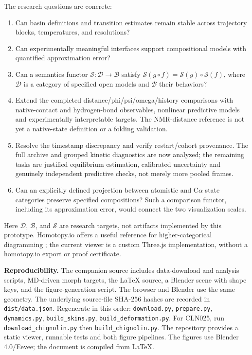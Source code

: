 \documentclass[11pt]{article}
\begin{document}
The research questions are concrete:
\begin{enumerate}
\item Can basin definitions and transition estimates remain stable across
trajectory blocks, temperatures, and resolutions?
\item Can experimentally meaningful interfaces support compositional
models with quantified approximation error?
\item Can a semantics functor $\mathcal S:\mathcal D\to\mathcal B$ satisfy
$\mathcal S(g\circ f)=\mathcal S(g)\circ\mathcal S(f)$, where $\mathcal D$
is a category of specified open models and $\mathcal B$ their behaviors?
\item Extend the completed distance/phi/psi/omega/history comparisons with
native-contact and hydrogen-bond observables, nonlinear predictive models
and experimentally interpretable targets. The NMR-distance reference is
not yet a native-state definition or a folding validation.
\item Resolve the timestamp discrepancy and verify restart/cohort provenance.
The full archive and grouped kinetic diagnostics are now analyzed; the
remaining tasks are justified equilibrium estimation, calibrated uncertainty
and genuinely independent predictive checks, not merely more pooled frames.
\item Can an explicitly defined projection between atomistic and C$\alpha$
state categories preserve specified compositions? Such a comparison functor,
including its approximation error, would connect the two visualization scales.
\end{enumerate}
Here $\mathcal D$, $\mathcal B$, and $\mathcal S$ are research targets,
not artifacts implemented by this prototype.
Homotopy.io offers a useful reference for higher-categorical diagramming
\cite{homotopy}; the current viewer is a custom Three.js implementation,
without a homotopy.io export or proof certificate.

\textbf{Reproducibility.}
The companion source includes data-download and analysis scripts,
MD-driven morph targets, the LaTeX source, a Blender scene with shape keys,
and the figure-generation script. The browser and Blender use the same
geometry. The underlying source-file SHA-256 hashes are recorded in
\texttt{dist/data.json}. Regenerate in this order:
\texttt{download.py}, \texttt{prepare.py}, \texttt{dynamics.py},
\texttt{build\_skins.py}, \texttt{build\_deformation.py}.
For CLN025, run \texttt{download\_chignolin.py} then \texttt{build\_chignolin.py}.
The repository provides a static viewer, runnable tests and both figure pipelines.
The figures use Blender 4.0/Eevee; the document is compiled from LaTeX.
\end{document}
